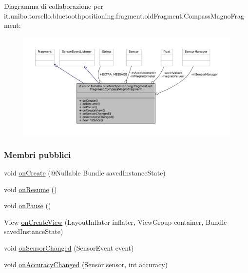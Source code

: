 Diagramma di collaborazione per it.\+unibo.\+torsello.\+bluetoothpositioning.\+fragment.\+old\+Fragment.\+Compass\+Magno\+Fragment\+:
\nopagebreak
\begin{figure}[H]
\begin{center}
\leavevmode
\includegraphics[width=350pt]{classit_1_1unibo_1_1torsello_1_1bluetoothpositioning_1_1fragment_1_1oldFragment_1_1CompassMagnoFragment__coll__graph}
\end{center}
\end{figure}
\subsubsection*{Membri pubblici}
\begin{DoxyCompactItemize}
\item 
void \hyperlink{classit_1_1unibo_1_1torsello_1_1bluetoothpositioning_1_1fragment_1_1oldFragment_1_1CompassMagnoFragment_ac7b5ed11aa2b31a711158c4b7dd1b3ec_ac7b5ed11aa2b31a711158c4b7dd1b3ec}{on\+Create} (@Nullable Bundle saved\+Instance\+State)
\item 
void \hyperlink{classit_1_1unibo_1_1torsello_1_1bluetoothpositioning_1_1fragment_1_1oldFragment_1_1CompassMagnoFragment_a035b99f484588d946d29f417113f0dc2_a035b99f484588d946d29f417113f0dc2}{on\+Resume} ()
\item 
void \hyperlink{classit_1_1unibo_1_1torsello_1_1bluetoothpositioning_1_1fragment_1_1oldFragment_1_1CompassMagnoFragment_a6cf13eaf60004dff28dd71ef75d6d719_a6cf13eaf60004dff28dd71ef75d6d719}{on\+Pause} ()
\item 
View \hyperlink{classit_1_1unibo_1_1torsello_1_1bluetoothpositioning_1_1fragment_1_1oldFragment_1_1CompassMagnoFragment_a3ea35cb229abc119708ab9b559781f45_a3ea35cb229abc119708ab9b559781f45}{on\+Create\+View} (Layout\+Inflater inflater, View\+Group container, Bundle saved\+Instance\+State)
\item 
void \hyperlink{classit_1_1unibo_1_1torsello_1_1bluetoothpositioning_1_1fragment_1_1oldFragment_1_1CompassMagnoFragment_aa18c6b8e8b0e10f5a37032660755a0fa_aa18c6b8e8b0e10f5a37032660755a0fa}{on\+Sensor\+Changed} (Sensor\+Event event)
\item 
void \hyperlink{classit_1_1unibo_1_1torsello_1_1bluetoothpositioning_1_1fragment_1_1oldFragment_1_1CompassMagnoFragment_ab7f5e45a12c41ff850294d67ae54ae4c_ab7f5e45a12c41ff850294d67ae54ae4c}{on\+Accuracy\+Changed} (Sensor sensor, int accuracy)
\end{DoxyCompactItemize}
